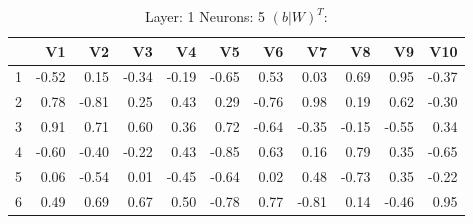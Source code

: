 \begin{table}[ht]
\centering
\begin{tabular}{rrrrrrrrrrr}
  \hline
 & V1 & V2 & V3 & V4 & V5 & V6 & V7 & V8 & V9 & V10 \\ 
  \hline
1 & -0.52 & 0.15 & -0.34 & -0.19 & -0.65 & 0.53 & 0.03 & 0.69 & 0.95 & -0.37 \\ 
  2 & 0.78 & -0.81 & 0.25 & 0.43 & 0.29 & -0.76 & 0.98 & 0.19 & 0.62 & -0.30 \\ 
  3 & 0.91 & 0.71 & 0.60 & 0.36 & 0.72 & -0.64 & -0.35 & -0.15 & -0.55 & 0.34 \\ 
  4 & -0.60 & -0.40 & -0.22 & 0.43 & -0.85 & 0.63 & 0.16 & 0.79 & 0.35 & -0.65 \\ 
  5 & 0.06 & -0.54 & 0.01 & -0.45 & -0.64 & 0.02 & 0.48 & -0.73 & 0.35 & -0.22 \\ 
  6 & 0.49 & 0.69 & 0.67 & 0.50 & -0.78 & 0.77 & -0.81 & 0.14 & -0.46 & 0.95 \\ 
   \hline
\end{tabular}
\caption{Layer: 1 Neurons: 5  $(b|W)^T$: 
} 
\end{table}
